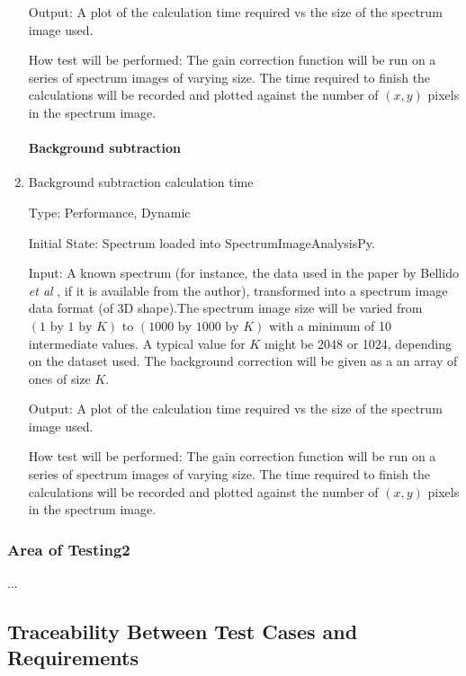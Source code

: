 \documentclass[12pt, titlepage]{article}
\newcommand{\progname}{SpectrumImageAnalysisPy}
\begin{document}
\begin{enumerate}
Output: A plot of the calculation time required vs the size of the spectrum image used.

How test will be performed: The gain correction function will be run on a series of spectrum images of varying size. The time required to finish the calculations will be recorded and plotted against the number of $(x, y)$ pixels in the spectrum image.\\

\paragraph{Background subtraction}
\item{Background subtraction calculation time}

Type: Performance, Dynamic

Initial State: Spectrum loaded into \progname{}.

Input: A known spectrum (for instance, the data used in the paper by Bellido \textit{et al} \cite{bellido_toward_2014}, if it is available from the author), transformed into a spectrum image data format (of 3D shape).The spectrum image size will be varied from $(1\text{ by }1\text{ by }K)$ to $(1000 \text{ by } 1000 \text{ by }K)$ with a minimum of 10 intermediate values. A typical value for $K$ might be 2048 or 1024, depending on the dataset used. The background correction will be given as a an array of ones of size $K$.

Output: A plot of the calculation time required vs the size of the spectrum image used.

How test will be performed: The gain correction function will be run on a series of spectrum images of varying size. The time required to finish the calculations will be recorded and plotted against the number of $(x, y)$ pixels in the spectrum image.\\ 

\end{enumerate}

\subsubsection{Area of Testing2}

...

\subsection{Traceability Between Test Cases and Requirements}
\end{document}
